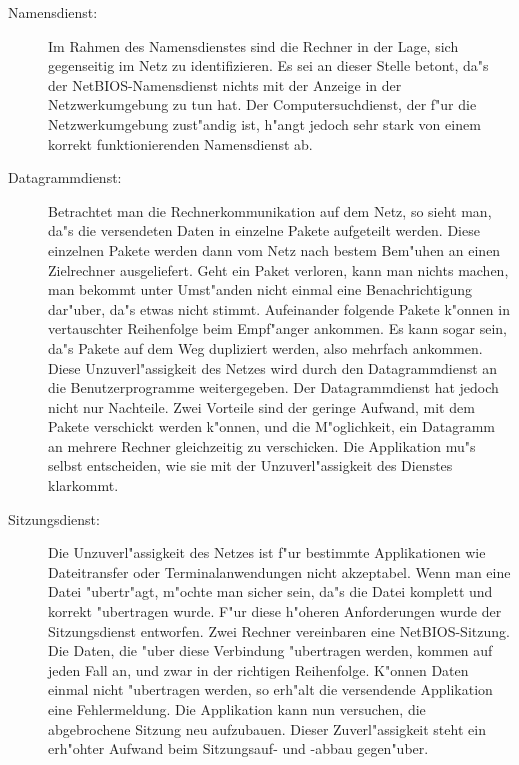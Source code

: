 \documentclass{scrartcl}
\begin{document}
\begin{description}
  
\item[Namensdienst:] Im Rahmen des Namensdienstes sind die Rechner in
  der Lage, sich gegenseitig im Netz zu identifizieren. Es sei an
  dieser Stelle betont, da"s der NetBIOS-Namensdienst nichts mit der
  Anzeige in der Netzwerkumgebung zu tun hat. Der Computersuchdienst,
  der f"ur die Netzwerkumgebung zust"andig ist, h"angt jedoch sehr
  stark von einem korrekt funktionierenden Namensdienst ab.

\item[Datagrammdienst:] Betrachtet man die Rechnerkommunikation auf
  dem Netz, so sieht man, da"s die versendeten Daten in einzelne
  Pakete aufgeteilt werden.
  Diese einzelnen Pakete werden dann vom Netz nach bestem Bem"uhen an
  einen Zielrechner ausgeliefert. Geht ein Paket verloren, kann man
  nichts machen, man bekommt unter Umst"anden nicht einmal eine
  Benachrichtigung dar"uber, da"s etwas nicht stimmt. Aufeinander
  folgende Pakete k"onnen in vertauschter Reihenfolge beim Empf"anger
  ankommen. Es kann sogar sein, da"s Pakete auf dem Weg dupliziert
  werden, also mehrfach ankommen. Diese Unzuverl"assigkeit des Netzes
  wird durch den Datagrammdienst an die Benutzerprogramme
  weitergegeben. Der Datagrammdienst hat jedoch nicht nur Nachteile.
  Zwei Vorteile sind der geringe Aufwand, mit dem Pakete verschickt
  werden k"onnen, und die M"oglichkeit, ein Datagramm an mehrere
  Rechner gleichzeitig zu verschicken. Die Applikation mu"s selbst
  entscheiden, wie sie mit der Unzuverl"assigkeit des Dienstes
  klarkommt.
  
\item[Sitzungsdienst:] Die Unzuverl"assigkeit des Netzes ist f"ur
bestimmte Applikationen wie Dateitransfer oder Terminalanwendungen
nicht akzeptabel. Wenn man eine Datei "ubertr"agt, m"ochte man sicher
sein, da"s die Datei komplett und korrekt "ubertragen wurde.  F"ur
diese h"oheren Anforderungen wurde der Sitzungsdienst entworfen. Zwei
Rechner vereinbaren eine NetBIOS-Sitzung. Die Daten, die "uber diese
Verbindung "ubertragen werden, kommen auf jeden Fall an, und zwar in
der richtigen Reihenfolge. K"onnen Daten einmal nicht "ubertragen
werden, so erh"alt die versendende Applikation eine Fehlermeldung. Die
Applikation kann nun versuchen, die abgebrochene Sitzung neu
aufzubauen. Dieser Zuverl"assigkeit steht ein erh"ohter Aufwand beim
Sitzungsauf- und -abbau gegen"uber.

\end{description}
\end{document}
